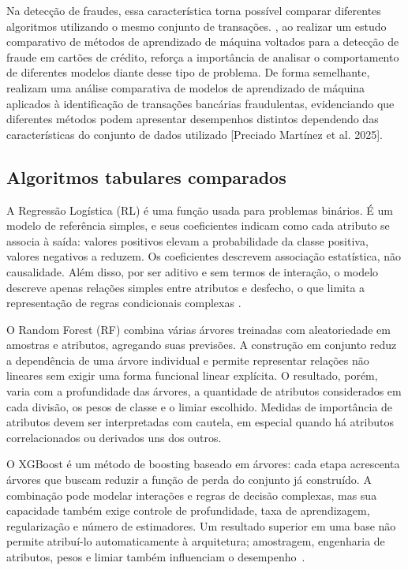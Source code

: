 \documentclass[11pt,a4paper]{article}
\begin{document}
Na detecção de fraudes, essa característica torna possível comparar diferentes algoritmos utilizando o mesmo conjunto de transações. \cite{Oliveira_2025}, ao realizar um estudo comparativo de métodos de aprendizado de máquina voltados para a detecção de fraude em cartões de crédito, reforça a importância de analisar o comportamento de diferentes modelos diante desse tipo de problema. De forma semelhante, \cite{PreciadoMartinez2025} realizam uma análise comparativa de modelos de aprendizado de máquina aplicados à identificação de transações bancárias fraudulentas, evidenciando que diferentes métodos podem apresentar desempenhos distintos dependendo das características do conjunto de dados utilizado [Preciado Martínez et al. 2025].

\subsection{Algoritmos tabulares comparados}

A Regressão Logística (RL) é uma função usada para problemas binários. É um modelo de referência simples, e seus coeficientes indicam como cada atributo se associa à saída: valores positivos elevam a probabilidade da classe positiva, valores negativos a reduzem. Os coeficientes descrevem associação estatística, não causalidade. Além disso, por ser aditivo e sem termos de interação, o modelo descreve apenas relações simples entre atributos e desfecho, o que limita a representação de regras condicionais complexas \cite{Cox1958, Mohri2018}.

O Random Forest (RF) combina várias árvores treinadas com aleatoriedade em amostras e atributos, agregando suas previsões. A construção em conjunto reduz a dependência de uma árvore individual e permite representar relações não lineares sem exigir uma forma funcional linear explícita. O resultado, porém, varia com a profundidade das árvores, a quantidade de atributos considerados em cada divisão, os pesos de classe e o limiar escolhido. Medidas de importância de atributos devem ser interpretadas com cautela, em especial quando há atributos correlacionados ou derivados uns dos outros\cite{Breiman2001}.

O XGBoost é um método de boosting baseado em árvores: cada etapa acrescenta árvores que buscam reduzir a função de perda do conjunto já construído. A combinação pode modelar interações e regras de decisão complexas, mas sua capacidade também exige controle de profundidade, taxa de aprendizagem, regularização e número de estimadores. Um resultado superior em uma base não permite atribuí-lo automaticamente à arquitetura; amostragem, engenharia de atributos, pesos e limiar também influenciam o desempenho~\cite{xgboost}.
\end{document}
